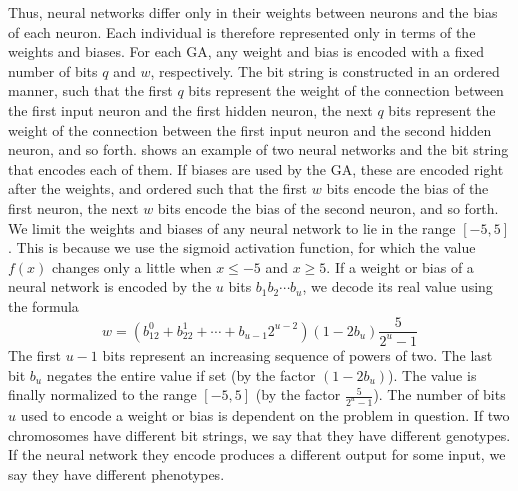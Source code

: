 Thus, neural networks differ only in their weights between neurons and the bias of each neuron. Each individual is therefore represented only in terms of the weights and biases. For each GA, any weight and bias is encoded with a fixed number of bits $q$ and $w$, respectively. The bit string is constructed in an ordered manner, such that the first $q$ bits represent the weight of the connection between the first input neuron and the first hidden neuron, the next $q$ bits represent the weight of the connection between the first input neuron and the second hidden neuron, and so forth.  shows an example of two neural networks and the bit string that encodes each of them. If biases are used by the GA, these are encoded right after the weights, and ordered such that the first $w$ bits encode the bias of the first neuron, the next $w$ bits encode the bias of the second neuron, and so forth. 
We limit the weights and biases of any neural network to lie in the range $[-5,5]$.
This is because we use the sigmoid activation function, for which the value $f(x)$ changes only a little when $x \leq -5$ and $x  \geq 5$. If a weight or bias of a neural network is encoded by the $u$ bits $b_1 b_2 \cdots b_u$, we decode its real value using the formula
\[
w = (b_12^0 + b_22^1 + \cdots + b_{u-1}2^{u-2})(1-2b_u)\frac{5}{2^u-1}
\]
The first $u-1$ bits represent an increasing sequence of powers of two. The last bit $b_u$ negates the entire value if set (by the factor $(1-2b_u)$). The value is finally normalized to the range $[-5, 5]$ (by the factor $\frac{5}{2^u-1}$).
The number of bits $u$ used to encode a weight or bias is dependent on the problem in question.
If two chromosomes have different bit strings, we say that they have different genotypes. If the neural network they encode produces a different output for some input, we say they have different phenotypes.



%
